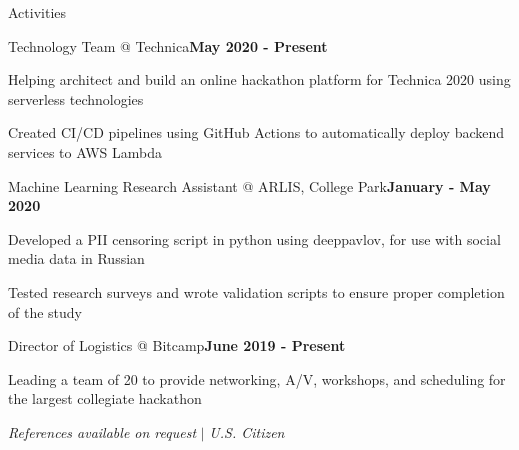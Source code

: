 \documentclass[mm,centered]{resume} %
\begin{document}
\begin{rSection}{Activities} 

	\begin{rSubsection}{Technology Team @ Technica}{\textbf{May 2020 - Present}}{}{}
   		\item Helping architect and build an online hackathon platform for Technica 2020 using serverless technologies
		\item Created CI/CD pipelines using GitHub Actions to automatically deploy backend services to AWS Lambda
	\end{rSubsection}

	\begin{rSubsection}{Machine Learning Research Assistant @ ARLIS, College Park}{\textbf{January - May 2020}}{}{}
		\item Developed a PII censoring script in python using deeppavlov, for use with social media data in Russian
		\item Tested research surveys and wrote validation scripts to ensure proper completion of the study
	\end{rSubsection}

	\begin{rSubsection}{Director of Logistics @ Bitcamp}{\textbf{June 2019 - Present}}{}{}
		\item Leading a team of 20 to provide networking, A/V, workshops, and scheduling for the largest collegiate hackathon
	\end{rSubsection}

\end{rSection}

\begin{center}
	\vspace{4mm}
	{\textit{References available on request} \hspace{1mm} $\vert$ \hspace{1mm} \textit{U.S. Citizen}}
\end{center}
\end{document}
